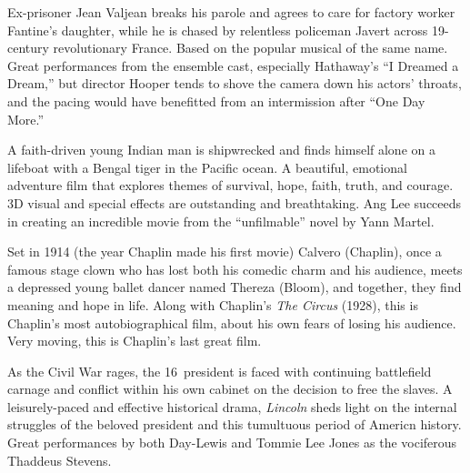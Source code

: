    Ex-prisoner Jean Valjean breaks his parole and agrees to care for factory worker Fantine's daughter, while he is chased by relentless policeman Javert across 19\th-century revolutionary France. Based on the popular musical of the same name. Great performances from the ensemble cast, especially Hathaway's ``I Dreamed a Dream,'' but director Hooper tends to shove the camera down his actors' throats, and the pacing would have benefitted from an intermission after ``One Day More.'' \author{DW} 

   A faith-driven young Indian man is shipwrecked and finds himself alone on a lifeboat with a Bengal tiger in the Pacific ocean. A beautiful, emotional adventure film that explores themes of survival, hope, faith, truth, and courage. 3D visual and special effects are outstanding and breathtaking. Ang Lee succeeds in creating an incredible movie from the ``unfilmable'' novel by Yann Martel. \author{DW} 

   Set in 1914 (the year Chaplin made his first movie) Calvero (Chaplin), once a famous stage clown who has lost both his comedic charm and his audience, meets a depressed young ballet dancer named Thereza (Bloom), and together, they find meaning and hope in life. Along with Chaplin's \textit{The Circus} (1928), this is Chaplin's most autobiographical film, about his own fears of losing his audience. Very moving, this is Chaplin's last great film. \author{AW}

   As the Civil War rages, the 16\th\ president is faced with continuing battlefield carnage and conflict within his own cabinet on the decision to free the slaves. A leisurely-paced and effective historical drama, \textit{Lincoln} sheds light on the internal struggles of the beloved president and this tumultuous period of Americn history. Great performances by both Day-Lewis and Tommie Lee Jones as the vociferous Thaddeus Stevens. \author{DW} 

